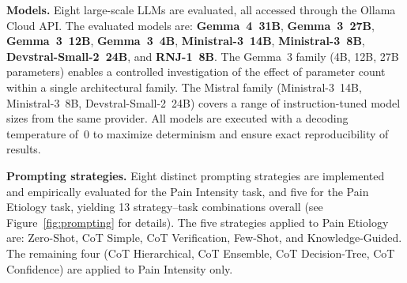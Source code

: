 \documentclass[preprint,12pt,authoryear]{elsarticle}
\begin{document}
\textbf{Models.} Eight large-scale LLMs are evaluated, all accessed through the Ollama Cloud API. The evaluated models are: \textbf{Gemma~4~31B}, \textbf{Gemma~3~27B}, \textbf{Gemma~3~12B}, \textbf{Gemma~3~4B}, \textbf{Ministral-3~14B}, \textbf{Ministral-3~8B}, \textbf{Devstral-Small-2~24B}, and \textbf{RNJ-1~8B}. The Gemma~3 family (4B, 12B, 27B parameters) enables a controlled investigation of the effect of parameter count within a single architectural family. The Mistral family (Ministral-3~14B, Ministral-3~8B, Devstral-Small-2~24B) covers a range of instruction-tuned model sizes from the same provider. All models are executed with a decoding temperature of~0 to maximize determinism and ensure exact reproducibility of results.

\textbf{Prompting strategies.} Eight distinct prompting strategies are implemented and empirically evaluated for the Pain Intensity task, and five for the Pain Etiology task, yielding 13 strategy--task combinations overall (see Figure~\ref{fig:prompting} for details). The five strategies applied to Pain Etiology are: Zero-Shot, CoT Simple, CoT Verification, Few-Shot, and Knowledge-Guided. The remaining four (CoT Hierarchical, CoT Ensemble, CoT Decision-Tree, CoT Confidence) are applied to Pain Intensity only.
\end{document}
